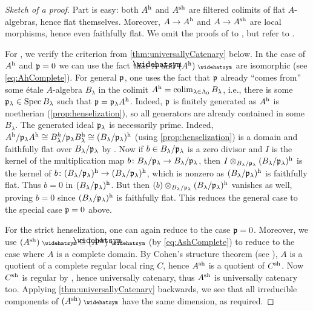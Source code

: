 \begin{proof}[Sketch of a proof]
	Part  is easy: both $A^{\mathrm{h}}$ and $A^{\mathrm{sh}}$ are filtered colimits of flat $A$-algebras, hence flat themselves. Moreover, $A\morphism A^\h$ and $A\morphism A^\sh$ are local morphisms, hence even faithfully flat. We omit the proofs of  to , but refer to \cite[(18.6)~and~(18.8)]{egaIV4}.
	
	For , we verify the criterion from \cref{thm:universallyCatenary} below. In the case of $A^{\mathrm{h}}$ and $\mathfrak{p}=0$ we can use the fact that $\roof{A}$ and $(A^\h)^\complete$ are isomorphic (see \cref{eq:AhComplete}). For general $\mathfrak{p}$, one uses the fact that $\mathfrak{p}$ already \enquote{comes from} some étale $A$-algebra $B_\lambda$ in the colimit $A^{\mathrm{h}}=\operatorname*{colim}_{\lambda\in\Lambda_0}B_\lambda$, i.e., there is some $\mathfrak{p}_\lambda\in\operatorname{Spec} B_\lambda$ such that $\mathfrak{p}=\mathfrak{p}_\lambda A^{\mathrm{h}}$. Indeed, $\mathfrak{p}$ is finitely generated as $A^{\mathrm{h}}$ is noetherian (\cref{prop:henselization}), so all generators are already contained in some $B_\lambda$. The generated ideal $\mathfrak{p}_\lambda$ is necessarily prime. Indeed, $A^{\mathrm{h}}/\mathfrak{p}_\lambda A^{\mathrm{h}}\cong B_\lambda^h/\mathfrak{p}_\lambda B_\lambda ^{\mathrm{h}}\cong (B_\lambda/\mathfrak{p}_\lambda)^{\mathrm{h}}$ (using \cref{prop:henselization}) is a domain and faithfully flat over $B_\lambda/\mathfrak{p}_\lambda$ by . Now if $b\in B_\lambda/\mathfrak{p}_\lambda$ is a zero divisor and $I$ is the kernel of the multiplication map $b\colon B_\lambda/\pp_\lambda\morphism B_\lambda/\pp_\lambda$, then $I\otimes_{B_\lambda/\mathfrak{p}_\lambda}(B_\lambda/\mathfrak{p}_\lambda)^{\mathrm{h}}$ is the kernel of $b\colon (B_\lambda/\pp_\lambda)^\h\morphism (B_\lambda/\pp_\lambda)^\h$, which is nonzero as $(B_\lambda/\mathfrak{p}_\lambda)^{\mathrm{h}}$ is faithfully flat. Thus $b=0$ in $(B_\lambda/\mathfrak{p}_\lambda)^{\mathrm{h}}$. But then $(b)\otimes_{B_\lambda/\mathfrak{p}_\lambda}(B_\lambda/\mathfrak{p}_\lambda)^{\mathrm{h}}$ vanishes as well, proving $b=0$ since $(B_\lambda/\mathfrak{p}_\lambda)^{\mathrm{h}}$ is faithfully flat. This reduces the general case to the special case $\mathfrak{p}=0$ above.
	
	For the strict henselization, one can again reduce to the case $\mathfrak{p}=0$. Moreover, we use $(A^\sh)^\complete\cong (\roof{A}^\sh)^\complete$ (by \cref{eq:AshComplete}) to reduce to the case where $A$ is a complete domain. By Cohen's structure theorem (see \cite[]{stacks-project}), $A$ is a quotient of a complete regular local ring $C$, hence $A^{\mathrm{sh}}$ is a quotient of $C^{\mathrm{sh}}$. Now $C^{\mathrm{sh}}$ is regular by , hence universally catenary, thus $A^{\mathrm{sh}}$ is universally catenary too. Applying \cref{thm:universallyCatenary} backwards, we see that all irreducible components of $(A^\sh)^\complete$ have the same dimension, as required.
\end{proof}
